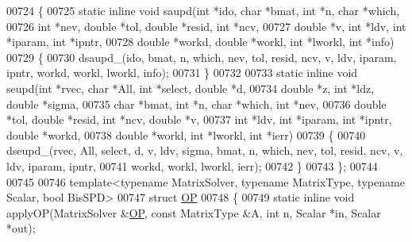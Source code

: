 \begin{DoxyCode}
00724 \{
00725   \textcolor{keyword}{static} \textcolor{keyword}{inline} \textcolor{keywordtype}{void} saupd(\textcolor{keywordtype}{int} *ido, \textcolor{keywordtype}{char} *bmat, \textcolor{keywordtype}{int} *n, \textcolor{keywordtype}{char} *which,
00726       \textcolor{keywordtype}{int} *nev, \textcolor{keywordtype}{double} *tol, \textcolor{keywordtype}{double} *resid, \textcolor{keywordtype}{int} *ncv,
00727       \textcolor{keywordtype}{double} *v, \textcolor{keywordtype}{int} *ldv, \textcolor{keywordtype}{int} *iparam, \textcolor{keywordtype}{int} *ipntr,
00728       \textcolor{keywordtype}{double} *workd, \textcolor{keywordtype}{double} *workl, \textcolor{keywordtype}{int} *lworkl, \textcolor{keywordtype}{int} *info)
00729   \{
00730     dsaupd\_(ido, bmat, n, which, nev, tol, resid, ncv, v, ldv, iparam, ipntr, workd, workl, lworkl, info);
00731   \}
00732 
00733   \textcolor{keyword}{static} \textcolor{keyword}{inline} \textcolor{keywordtype}{void} seupd(\textcolor{keywordtype}{int} *rvec, \textcolor{keywordtype}{char} *All, \textcolor{keywordtype}{int} *select, \textcolor{keywordtype}{double} *d,
00734       \textcolor{keywordtype}{double} *z, \textcolor{keywordtype}{int} *ldz, \textcolor{keywordtype}{double} *sigma,
00735       \textcolor{keywordtype}{char} *bmat, \textcolor{keywordtype}{int} *n, \textcolor{keywordtype}{char} *which, \textcolor{keywordtype}{int} *nev,
00736       \textcolor{keywordtype}{double} *tol, \textcolor{keywordtype}{double} *resid, \textcolor{keywordtype}{int} *ncv, \textcolor{keywordtype}{double} *v,
00737       \textcolor{keywordtype}{int} *ldv, \textcolor{keywordtype}{int} *iparam, \textcolor{keywordtype}{int} *ipntr, \textcolor{keywordtype}{double} *workd,
00738       \textcolor{keywordtype}{double} *workl, \textcolor{keywordtype}{int} *lworkl, \textcolor{keywordtype}{int} *ierr)
00739   \{
00740     dseupd\_(rvec, All, select, d, v, ldv, sigma, bmat, n, which, nev, tol, resid, ncv, v, ldv, iparam, 
      ipntr,
00741         workd, workl, lworkl, ierr);
00742   \}
00743 \};
00744 
00745 
00746 \textcolor{keyword}{template}<\textcolor{keyword}{typename} MatrixSolver, \textcolor{keyword}{typename} MatrixType, \textcolor{keyword}{typename} Scalar, \textcolor{keywordtype}{bool} BisSPD>
00747 \textcolor{keyword}{struct }\hyperlink{struct_eigen_1_1internal_1_1_o_p}{OP}
00748 \{
00749     \textcolor{keyword}{static} \textcolor{keyword}{inline} \textcolor{keywordtype}{void} applyOP(MatrixSolver &\hyperlink{struct_eigen_1_1internal_1_1_o_p}{OP}, \textcolor{keyword}{const} MatrixType &A, \textcolor{keywordtype}{int} n, Scalar *in, Scalar *out);

\end{DoxyCode}
